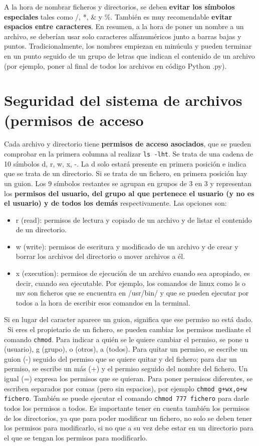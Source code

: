 A la hora de nombrar ficheros y directorios, se deben \textbf{evitar los símbolos especiales} tales como /, *, \& y \%. También es muy recomendable \textbf{evitar espacios entre caracteres}. En resumen, a la hora de poner un nombre a un archivo, se deberían usar solo caracteres alfanuméricos junto a barras bajas y puntos. Tradicionalmente, los nombres empiezan en minúcula y pueden terminar en un punto seguido de un grupo de letras que indican el contenido de un archivo (por ejemplo, poner al final de todos los archivos en código Python .py).

\section{Seguridad del sistema de archivos (permisos de acceso}
Cada archivo y directorio tiene \textbf{permisos de acceso asociados}, que se pueden comprobar en la primera columna al realizar \texttt{ls -lht}. Se trata de una cadena de 10 símbolos d, r, w, x, -. La d solo estará presente en primera posición e indica que se trata de un directorio. Si se trata de un fichero, en primera posición hay un guion. Los 9 símbolos restantes se agrupan en grupos de 3 en 3 y representan los \textbf{permisos del usuario, del grupo al que pertenece el usuario (y no es el usuario) y de todos los demás} respectivamente. Las opciones son:
\begin{itemize}
\item r (read): permisos de lectura y copiado de un archivo y de listar el contenido de un directorio.
\item w (write): permisos de escritura y modificado de un archivo y de crear y borrar los archivos del directorio o mover archivos a él.
\item x (execution): permisos de ejecución de un archivo cuando sea apropiado, es decir, cuando sea ejecutable. Por ejemplo, los comandos de linux como ls o mv son ficheros que se encuentra en /usr/bin/ y que se pueden ejecutar por todos a la hora de escribir esos comandos en la terminal. 
\end{itemize}
Si en lugar del caracter aparece un guion, significa que ese permiso no está dado.  \ Si eres el propietario de un fichero, se pueden cambiar los permisos mediante el comando \texttt{chmod}. Para indicar a quién se le quiere cambiar el permiso, se pone u (usuario), g (grupo), o (otros), a (todos). Para quitar un permiso, se escribe un guion (-) seguido del permiso que se quiere quitar y del fichero; para dar un permiso, se escribe un más (+) y el permiso seguido del nombre del fichero. Un igual (=) expresa los permisos que se quieran. Para poner permisos diferentes, se escriben separados por comas (pero sin espacios), por ejemplo \texttt{chmod g+wx,o+w fichero}. También se puede ejecutar el comando \texttt{chmod 777 fichero} para darle todos los permisos a todos. Es importante tener en cuenta también los permisos de los directorios, ya que para poder modificar un fichero, no solo se deben tener los permisos para modificarlo, si no que a su vez debe estar en un directorio para el que se tengan los permisos para modificarlo.

